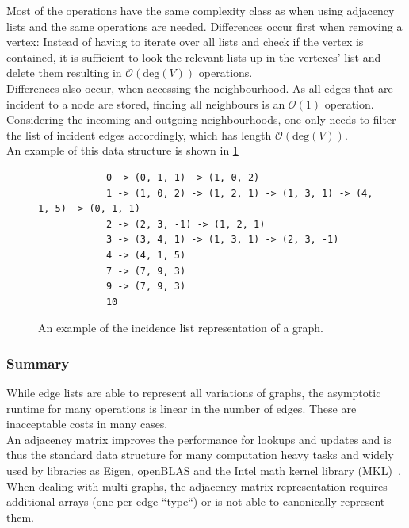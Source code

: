         Most of the operations have the same complexity class as when using adjacency lists and the same operations are needed. 
        Differences occur first when removing a vertex:
        Instead of having to iterate over all lists and check if the vertex is contained, it is sufficient to look the relevant lists up in the vertexes' list and delete them resulting in $\mathcal{O}(\text{deg}(V))$ operations. \\
        
        Differences also occur, when accessing the neighbourhood. 
        As all edges that are incident to a node are stored, finding all neighbours is an $\mathcal{O}(1)$ operation. 
        Considering the incoming and outgoing neighbourhoods, one only needs to filter the list of incident edges accordingly, which has length $\mathcal{O}(\text{deg}(V))$.\\
        
        An example of this data structure is shown in \ref{incidencel}
        
        \begin{figure}[htp]
         \begin{center}
          \begin{verbatim}
            0 -> (0, 1, 1) -> (1, 0, 2)
            1 -> (1, 0, 2) -> (1, 2, 1) -> (1, 3, 1) -> (4, 1, 5) -> (0, 1, 1)
            2 -> (2, 3, -1) -> (1, 2, 1)
            3 -> (3, 4, 1) -> (1, 3, 1) -> (2, 3, -1)
            4 -> (4, 1, 5)
            7 -> (7, 9, 3)
            9 -> (7, 9, 3)
            10
          \end{verbatim}
         \end{center}
         \caption{An example of the incidence list representation of a graph.}
         \label{incidencel}
        \end{figure}
        
        
        
        \subsubsection*{Summary}
        While edge lists are able to represent all variations of graphs, the asymptotic runtime for many operations is linear in the number of edges. 
        These are inacceptable costs in many cases. \\
        
        An adjacency matrix improves the performance for lookups and updates and is thus the standard data structure for many computation heavy tasks and widely used by libraries as Eigen, openBLAS and the Intel math kernel library (MKL)~\autocite{MatrixStorageSchemes-2021-03-05, EigenTheMatrixclass-2020-12-05, MatrixStorageSchemes-1999-10-01}. 
        When dealing with multi-graphs, the adjacency matrix representation requires additional arrays (one per edge ``type``) or is not able to canonically represent them. \\
        
